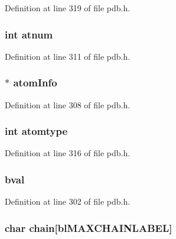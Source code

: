 Definition at line 319 of file pdb.\-h.

\hypertarget{structpdb__entry_af0f05b6c256a3631c9735a45190bc2ae}{
\subsubsection[{atnum}]{\setlength{\rightskip}{0pt plus 5cm}int atnum}}\label{structpdb__entry_af0f05b6c256a3631c9735a45190bc2ae}


Definition at line 311 of file pdb.\-h.

\hypertarget{structpdb__entry_ab1a637f5eef3078b04fe57e46ac23590}{
\subsubsection[{atom\-Info}]{$\ast$ atom\-Info}}\label{structpdb__entry_ab1a637f5eef3078b04fe57e46ac23590}


Definition at line 308 of file pdb.\-h.

\hypertarget{structpdb__entry_a507b61dfebb9c3eb396cd9ef27f84aae}{
\subsubsection[{atomtype}]{\setlength{\rightskip}{0pt plus 5cm}int atomtype}}\label{structpdb__entry_a507b61dfebb9c3eb396cd9ef27f84aae}


Definition at line 316 of file pdb.\-h.

\hypertarget{structpdb__entry_ae02a474aa89a746f306e1fbd46bb8402}{
\subsubsection[{bval}]{ bval}}\label{structpdb__entry_ae02a474aa89a746f306e1fbd46bb8402}


Definition at line 302 of file pdb.\-h.

\hypertarget{structpdb__entry_abe96afafc1017db40e25d4183a058bc5}{
\subsubsection[{chain}]{\setlength{\rightskip}{0pt plus 5cm}char chain\mbox{[}{\bf bl\-M\-A\-X\-C\-H\-A\-I\-N\-L\-A\-B\-E\-L}\mbox{]}}}\label{structpdb__entry_abe96afafc1017db40e25d4183a058bc5}


